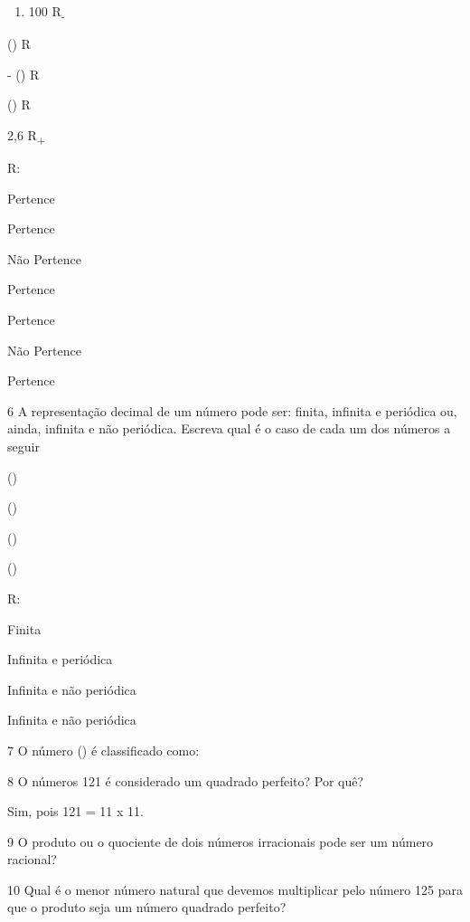 \begin{enumerate}
\def\labelenumi{\alph{enumi})}
\setcounter{enumi}{2}
\tightlist
\item
  100 R\textsubscript{-}
\end{enumerate}
\item () R
\item - () R
\item () R
\item 2,6 R\textsubscript{+}

R:
\item Pertence
\item Pertence
\item Não Pertence
\item Pertence
\item Pertence
\item Não Pertence
\item Pertence

\num{6} A representação decimal de um número pode ser: finita, infinita e
periódica ou, ainda, infinita e não periódica. Escreva qual é o caso de
cada um dos números a seguir
\item()
\item()
\item ()
\item ()

R:
\item Finita
\item Infinita e periódica
\item Infinita e não periódica
\item Infinita e não periódica

\num{7} O número (\pi) é classificado como:


\num{8} O números 121 é considerado um quadrado perfeito? Por quê?

Sim, pois 121 = 11 x 11.

\num{9} O produto ou o quociente de dois números irracionais pode ser um
número racional?


\num{10} Qual é o menor número natural que devemos multiplicar pelo número
125 para que o produto seja um número quadrado perfeito?


